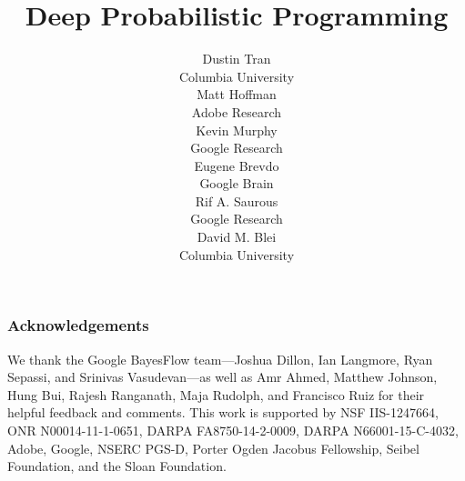 \documentclass{article}
\title{Deep Probabilistic Programming}
\author{%
Dustin Tran \\
Columbia University \\
\And
Matt Hoffman \\
Adobe Research \\
\And
Kevin Murphy \\
Google Research \\
\AND
\hspace{1.5em}
Eugene Brevdo \\
\hspace{1.5em}
Google Brain \\
\And
\hspace{1.5em}
Rif A. Saurous \\
\hspace{1.5em}
Google Research \\
\And
David M. Blei \\
Columbia University \\
}
\begin{document}
\maketitle






\subsubsection*{Acknowledgements}
We thank the Google BayesFlow team---Joshua Dillon, Ian Langmore, Ryan
Sepassi, and Srinivas Vasudevan---as well as Amr Ahmed, Matthew
Johnson, Hung Bui, Rajesh Ranganath, Maja Rudolph, and Francisco Ruiz
for their helpful feedback and comments.
This work is supported by NSF IIS-1247664,  ONR N00014-11-1-0651,
DARPA FA8750-14-2-0009, DARPA N66001-15-C-4032, Adobe, Google, NSERC
PGS-D, Porter Ogden Jacobus Fellowship, Seibel Foundation, and the
Sloan Foundation.

\clearpage



\appendix

\end{document}

